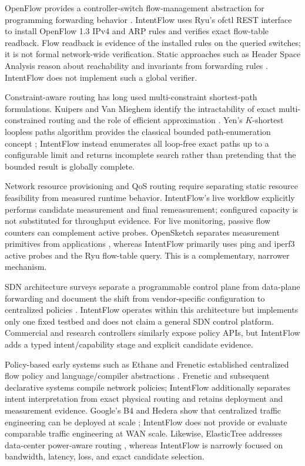 \documentclass[conference]{IEEEtran}
\begin{document}
OpenFlow provides a controller-switch flow-management abstraction for
programming forwarding behavior \cite{mckeown2008openflow}. IntentFlow uses
Ryu's ofctl REST interface to install OpenFlow 1.3 IPv4 and ARP rules and
verifies exact flow-table readback. Flow readback is evidence of the installed
rules on the queried switches; it is not formal network-wide verification.
Static approaches such as Header Space Analysis reason about reachability
and invariants from forwarding rules \cite{kazemian2012hsa}. IntentFlow does
not implement such a global verifier.

Constraint-aware routing has long used multi-constraint shortest-path
formulations. Kuipers and Van Mieghem identify the intractability of exact
multi-constrained routing and the role of efficient approximation
\cite{kuipers2002mamcra}. Yen's $K$-shortest loopless paths algorithm provides
the classical bounded path-enumeration concept \cite{yen1971}; IntentFlow
instead enumerates all loop-free exact paths up to a configurable limit and
returns incomplete search rather than pretending that the bounded result is
globally complete.

Network resource provisioning and QoS routing require separating static
resource feasibility from measured runtime behavior. IntentFlow's live
workflow explicitly performs candidate measurement and final remeasurement;
configured capacity is not substituted for throughput evidence. For live
monitoring, passive flow counters can complement active probes. OpenSketch
separates measurement primitives from applications \cite{yu2013opensketch},
whereas IntentFlow primarily uses ping and iperf3 active probes and the Ryu
flow-table query. This is a complementary, narrower mechanism.

SDN architecture surveys separate a programmable control plane from data-plane
forwarding and document the shift from vendor-specific configuration to
centralized policies \cite{kreutz2015,nunes2014,feamster2014}. IntentFlow
operates within this architecture but implements only one fixed testbed and
does not claim a general SDN control platform. Commercial and research
controllers similarly expose policy APIs, but IntentFlow adds a typed
intent/capability stage and explicit candidate evidence.

Policy-based early systems such as Ethane and Frenetic established centralized
flow policy and language/compiler abstractions
\cite{casado2007ethane,foster2011frenetic}. Frenetic and subsequent declarative
systems compile network policies; IntentFlow additionally separates
intent interpretation from exact physical routing and retains deployment and
measurement evidence. Google's B4 and Hedera show that centralized traffic
engineering can be deployed at scale \cite{jain2013b4,hedera2010}; IntentFlow
does not provide or evaluate comparable traffic engineering at WAN scale.
Likewise, ElasticTree addresses data-center power-aware routing
\cite{heller2010elastictree}, whereas IntentFlow is narrowly focused on
bandwidth, latency, loss, and exact candidate selection.
\end{document}
